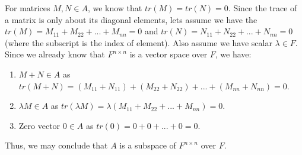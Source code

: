 \documentclass[11pt]{article}
\begin{document}
For matrices $M, N \in A$, we know that $tr(M) = tr(N) = 0$. Since the trace of a matrix is only about its diagonal elements, lets assume we have the $tr(M) = M_{11} + M_{22} + ... +  M_{nn} = 0$ and $tr(N) = N_{11} + N_{22} + ... +  N_{nn} = 0$ (where the subscript is the index of element). Also assume we have scalar $\lambda \in F$. Since we already know that $F^{n \times n}$ is a vector space over $F$, we have:

\begin{enumerate}
    \item $M + N \in A$ as $tr(M + N) = (M_{11} + N_{11}) + (M_{22} + N_{22}) +  ... + (M_{nn} + N_{nn}) = 0$.
    \item $\lambda M \in A$ as $tr(\lambda M) = \lambda (M_{11} + M_{22} + ... +  M_{nn}) = 0$.
    \item Zero vector $0 \in A$ as $tr(0) = 0 + 0 + ... + 0 = 0$.
\end{enumerate}

Thus, we may conclude that $A$ is a subspace of $F^{n \times n}$ over $F$.
\end{document}
